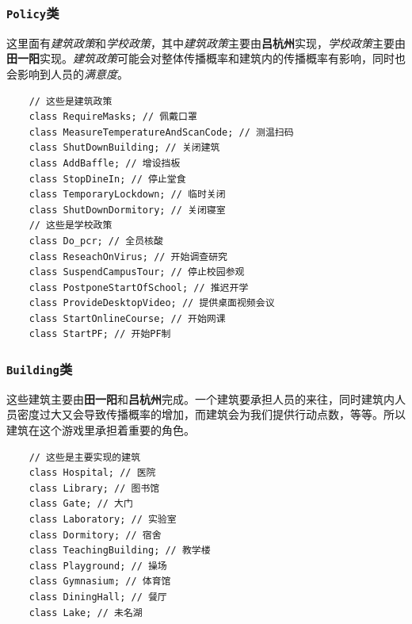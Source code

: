 \documentclass[hyperref,a4paper,UTF8]{ctexart}
\begin{document}
\subsubsection{\texttt{Policy}类}
这里面有\textit{建筑政策}和\textit{学校政策}，其中\textit{建筑政策}主要由\textbf{吕杭州}实现，\textit{学校政策}主要由\textbf{田一阳}实现。\textit{建筑政策}可能会对整体传播概率和建筑内的传播概率有影响，同时也会影响到人员的\textit{满意度}。

\begin{verbatim}
    // 这些是建筑政策
    class RequireMasks; // 佩戴口罩
    class MeasureTemperatureAndScanCode; // 测温扫码
    class ShutDownBuilding; // 关闭建筑
    class AddBaffle; // 增设挡板
    class StopDineIn; // 停止堂食
    class TemporaryLockdown; // 临时关闭
    class ShutDownDormitory; // 关闭寝室
    // 这些是学校政策
    class Do_pcr; // 全员核酸
    class ReseachOnVirus; // 开始调查研究
    class SuspendCampusTour; // 停止校园参观
    class PostponeStartOfSchool; // 推迟开学
    class ProvideDesktopVideo; // 提供桌面视频会议
    class StartOnlineCourse; // 开始网课
    class StartPF; // 开始PF制
\end{verbatim}

\subsubsection{\texttt{Building}类}
这些建筑主要由\textbf{田一阳}和\textbf{吕杭州}完成。一个建筑要承担人员的来往，同时建筑内人员密度过大又会导致传播概率的增加，而建筑会为我们提供行动点数，等等。所以建筑在这个游戏里承担着重要的角色。
\begin{verbatim}
    // 这些是主要实现的建筑
    class Hospital; // 医院
    class Library; // 图书馆
    class Gate; // 大门
    class Laboratory; // 实验室
    class Dormitory; // 宿舍
    class TeachingBuilding; // 教学楼
    class Playground; // 操场
    class Gymnasium; // 体育馆
    class DiningHall; // 餐厅
    class Lake; // 未名湖
\end{verbatim}
\end{document}
